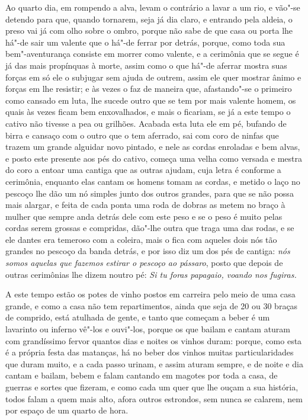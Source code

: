 \begin{linenumbers}
 Ao quarto dia, em rompendo a alva, levam o contrário a lavar a um rio,
e vão"-se detendo para que, quando tornarem, seja já dia claro, e
entrando pela aldeia, o preso vai já com olho sobre o ombro, porque não
sabe de que casa ou porta lhe há"-de sair um valente que o há"-de ferrar
por detrás, porque, como toda sua bem"-aventurança consiste em morrer
como valente, e a cerimônia que se segue é já das mais propínquas à
morte, assim como o que há"-de aferrar mostra suas forças em só ele o
subjugar sem ajuda de outrem, assim ele quer mostrar ânimo e forças em
lhe resistir; e às vezes o faz de maneira que, afastando"-se o primeiro
como cansado em luta, lhe sucede outro que se tem por mais valente
homem, os quais às vezes ficam bem enxovalhados, e mais o ficariam, se
já a este tempo o cativo não tivesse a pea ou grilhões. Acabada esta
luta ele em pé, bufando de birra e cansaço com o outro que o tem
aferrado, sai com coro de ninfas que trazem um grande alguidar novo
pintado, e nele as cordas enroladas e bem alvas, e posto este presente
aos pés do cativo, começa uma velha como versada e mestra do coro a
entoar uma cantiga que as outras ajudam, cuja letra é conforme a
cerimônia, enquanto elas cantam os homens tomam as cordas, e metido o
laço no pescoço lhe dão um nó simples junto dos outros grandes, para
que se não possa mais alargar, e feita de cada ponta uma roda de dobras
as metem no braço à mulher que sempre anda detrás dele com este peso e
se o peso é muito pelas cordas serem grossas e compridas, dão"-lhe outra
que traga uma das rodas, e se ele dantes era temeroso com a coleira,
mais o fica com aqueles dois nós tão grandes no pescoço da banda
detrás, e por isso diz um dos pés de cantiga: \textit{nós somos aquelas
que fazemos estirar o pescoço ao pássaro}, posto que depois de outras
cerimônias lhe dizem noutro pé: \textit{Si tu foras papagaio, voando nos fugiras.} 

 A este tempo estão os potes de vinho postos em carreira pelo
meio de uma casa grande, e como a casa não tem repartimentos, ainda
que seja de 20 ou 30 braças de comprido, está atulhada de gente, e 
tanto que começam a beber é um lavarinto ou inferno vê"-los e ouvi"-los,
porque os que bailam e cantam aturam com grandíssimo fervor quantos
dias e noites os vinhos duram: porque, como esta é a própria festa das
matanças, há no beber dos vinhos muitas particularidades que duram
muito, e a cada passo urinam, e assim aturam sempre, e de noite e dia
cantam e bailam, bebem e falam cantando em magotes por toda a casa, de
guerras e sortes que fizeram, e como cada um quer que lhe ouçam a sua
história, todos falam a quem mais alto, afora outros estrondos, sem
nunca se calarem, nem por espaço de um quarto de hora.


\end{linenumbers}
